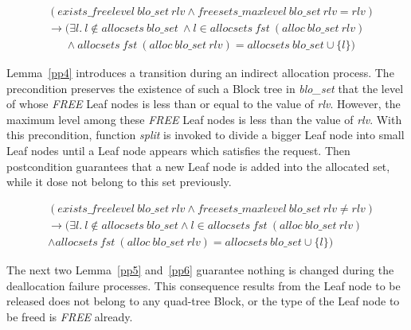 \begin{lemma} 
\label{pp3}
\end{lemma}
\vspace{-7pt}
{\footnotesize
\begin{align*}
&(exists\_freelevel\ blo\_set\ rlv \wedge freesets\_maxlevel\ blo\_set\ rlv = rlv) \\ &\longrightarrow (\exists l.\ l \notin allocsets\ blo\_set\ \wedge l \in allocsets\ fst\ (alloc\ blo\_set\ rlv) \\
&\ \ \ \ \ \ \ \wedge allocsets\ fst\ (alloc\ blo\_set\ rlv) = allocsets\ blo\_set \cup \lbrace l \rbrace)
\end{align*}
}
\vspace{-12pt}

Lemma~\ref{pp4} introduces a transition during an indirect allocation process. The precondition preserves the existence of such a Block tree in \emph{blo\_set} that the level of whose \emph{FREE} Leaf nodes is less than or equal to the value of \emph{rlv}. However, the maximum level among these \emph{FREE} Leaf nodes is less than the value of \emph{rlv}. With this precondition, function \emph{split} is invoked to divide a bigger Leaf node into small Leaf nodes until a Leaf node appears which satisfies the request. Then postcondition guarantees that a new Leaf node is added into the allocated set, while it dose not belong to this set previously.

\begin{lemma} 
\label{pp4}
\end{lemma}
\vspace{-7pt}
{\footnotesize
\begin{align*}
&(exists\_freelevel\ blo\_set\ rlv \wedge freesets\_maxlevel\ blo\_set\ rlv \neq rlv) \\
&\longrightarrow (\exists l.\ l \notin allocsets\ blo\_set \wedge l \in allocsets\ fst\ (alloc\ blo\_set\ rlv) \\
&\wedge allocsets\ fst\ (alloc\ blo\_set\ rlv) = allocsets\ blo\_set \cup \lbrace l \rbrace)
\end{align*}
}
\vspace{-12pt}

The next two Lemma~\ref{pp5} and~\ref{pp6} guarantee nothing is changed during the deallocation failure processes. This consequence results from the Leaf node to be released does not belong to any quad-tree Block, or the type of the Leaf node to be freed is \emph{FREE} already.

